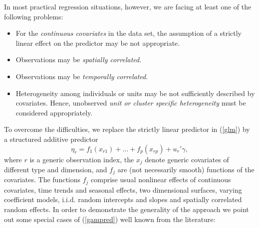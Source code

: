 In most practical regression situations, however, we are facing at
least one of the following problems:
\begin{itemize}
\item For the {\em continuous covariates} in the data set, the assumption of a strictly linear
effect on the predictor may be not appropriate. \vspace{-0.2cm}
\item Observations may be {\em spatially correlated}.
\vspace{-0.2cm}
\item Observations may be {\em temporally correlated}.
\vspace{-0.2cm}
\item  Heterogeneity among individuals or units may be not sufficiently described by covariates. Hence,
unobserved {\em unit or cluster specific heterogeneity} must be
considered appropriately.
\end{itemize}
To overcome the difficulties, we replace the strictly linear
predictor in (\ref{glm}) by a structured additive predictor
\begin{equation}
\label{gampred}
\eta_{r}=f_{1}(x_{r1})+\dots+f_{p}(x_{rp})+u_r'\gamma,
\end{equation}
where $r$ is a generic observation index, the $x_j$ denote generic
covariates of different type and dimension, and $f_j$ are (not
necessarily smooth) functions of the covariates. The functions
$f_j$ comprise usual nonlinear effects of continuous covariates,
time trends and seasonal effects, two dimensional surfaces,
varying coefficient models, i.i.d. random intercepts and slopes
and spatially correlated random effects. In order to demonstrate
the generality of the approach we point out some special cases of
(\ref{gampred}) well known from the literature:
